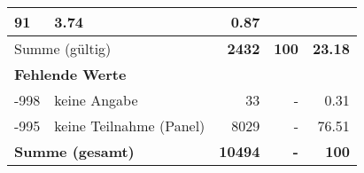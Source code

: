 \begin{longtable}{lXrrr}
       \num{91} &
       \num[round-mode=places,round-precision=2]{3,74} &
         \num[round-mode=places,round-precision=2]{0,87} \\
     \midrule
     \multicolumn{2}{l}{Summe (gültig)} &
       \textbf{\num{2432}} &
     \textbf{100} &
       \textbf{\num[round-mode=places,round-precision=2]{23,18}} \\
     \multicolumn{5}{l}{\textbf{Fehlende Werte}}\\
       -998 &
       keine Angabe &
         \num{33} &
        - &
         \num[round-mode=places,round-precision=2]{0,31} \\
       -995 &
       keine Teilnahme (Panel) &
         \num{8029} &
        - &
         \num[round-mode=places,round-precision=2]{76,51} \\
     \midrule
     \multicolumn{2}{l}{\textbf{Summe (gesamt)}} &
          \textbf{\num{10494}} &
        \textbf{-} &
        \textbf{100} \\
     \bottomrule
     \end{longtable}
     
